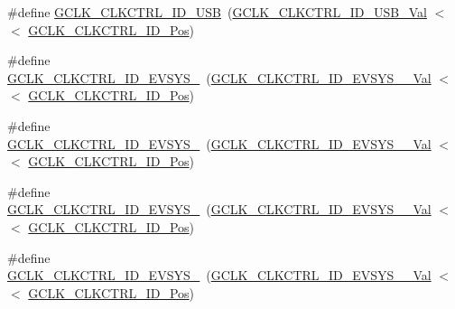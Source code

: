 \begin{DoxyCompactItemize}
\item 
\#define \mbox{\hyperlink{group___s_a_m_d21___g_c_l_k_ga8260e7bdb03e8421e8e8aeeafcc073f3}{G\+C\+L\+K\+\_\+\+C\+L\+K\+C\+T\+R\+L\+\_\+\+I\+D\+\_\+\+U\+SB}}~(\mbox{\hyperlink{group___s_a_m_d21___g_c_l_k_ga5bff2fb927a4b63837aec5ea464ba61b}{G\+C\+L\+K\+\_\+\+C\+L\+K\+C\+T\+R\+L\+\_\+\+I\+D\+\_\+\+U\+S\+B\+\_\+\+Val}}       $<$$<$ \mbox{\hyperlink{group___s_a_m_d21___g_c_l_k_ga882860b306b819b8bb342bebd55c23aa}{G\+C\+L\+K\+\_\+\+C\+L\+K\+C\+T\+R\+L\+\_\+\+I\+D\+\_\+\+Pos}})
\item 
\#define \mbox{\hyperlink{group___s_a_m_d21___g_c_l_k_ga3a091994ea0d246cac926f9387f5f60e}{G\+C\+L\+K\+\_\+\+C\+L\+K\+C\+T\+R\+L\+\_\+\+I\+D\+\_\+\+E\+V\+S\+Y\+S\+\_}}~(\mbox{\hyperlink{group___s_a_m_d21___g_c_l_k_ga24b8d07991d73b984d3ee5dbbfa43de1}{G\+C\+L\+K\+\_\+\+C\+L\+K\+C\+T\+R\+L\+\_\+\+I\+D\+\_\+\+E\+V\+S\+Y\+S\+\_\+\_\+\+Val}}   $<$$<$ \mbox{\hyperlink{group___s_a_m_d21___g_c_l_k_ga882860b306b819b8bb342bebd55c23aa}{G\+C\+L\+K\+\_\+\+C\+L\+K\+C\+T\+R\+L\+\_\+\+I\+D\+\_\+\+Pos}})
\item 
\#define \mbox{\hyperlink{group___s_a_m_d21___g_c_l_k_ga7b413cbf9a0a4a5261a629ff4b02eb1d}{G\+C\+L\+K\+\_\+\+C\+L\+K\+C\+T\+R\+L\+\_\+\+I\+D\+\_\+\+E\+V\+S\+Y\+S\+\_}}~(\mbox{\hyperlink{group___s_a_m_d21___g_c_l_k_ga33cf2ca39bd86e29c71d2d46e23419b5}{G\+C\+L\+K\+\_\+\+C\+L\+K\+C\+T\+R\+L\+\_\+\+I\+D\+\_\+\+E\+V\+S\+Y\+S\+\_\+\_\+\+Val}}   $<$$<$ \mbox{\hyperlink{group___s_a_m_d21___g_c_l_k_ga882860b306b819b8bb342bebd55c23aa}{G\+C\+L\+K\+\_\+\+C\+L\+K\+C\+T\+R\+L\+\_\+\+I\+D\+\_\+\+Pos}})
\item 
\#define \mbox{\hyperlink{group___s_a_m_d21___g_c_l_k_ga130e1eafd6a515744428291c962bb3c3}{G\+C\+L\+K\+\_\+\+C\+L\+K\+C\+T\+R\+L\+\_\+\+I\+D\+\_\+\+E\+V\+S\+Y\+S\+\_}}~(\mbox{\hyperlink{group___s_a_m_d21___g_c_l_k_ga2a41efb893147142a523da4ffd9b6e4e}{G\+C\+L\+K\+\_\+\+C\+L\+K\+C\+T\+R\+L\+\_\+\+I\+D\+\_\+\+E\+V\+S\+Y\+S\+\_\+\_\+\+Val}}   $<$$<$ \mbox{\hyperlink{group___s_a_m_d21___g_c_l_k_ga882860b306b819b8bb342bebd55c23aa}{G\+C\+L\+K\+\_\+\+C\+L\+K\+C\+T\+R\+L\+\_\+\+I\+D\+\_\+\+Pos}})
\item 
\#define \mbox{\hyperlink{group___s_a_m_d21___g_c_l_k_ga08ec8d0eddcfaeefdfb1cec9fac63fd8}{G\+C\+L\+K\+\_\+\+C\+L\+K\+C\+T\+R\+L\+\_\+\+I\+D\+\_\+\+E\+V\+S\+Y\+S\+\_}}~(\mbox{\hyperlink{group___s_a_m_d21___g_c_l_k_gaf3e4dae1c92305f72ab76d6574385b69}{G\+C\+L\+K\+\_\+\+C\+L\+K\+C\+T\+R\+L\+\_\+\+I\+D\+\_\+\+E\+V\+S\+Y\+S\+\_\+\_\+\+Val}}   $<$$<$ \mbox{\hyperlink{group___s_a_m_d21___g_c_l_k_ga882860b306b819b8bb342bebd55c23aa}{G\+C\+L\+K\+\_\+\+C\+L\+K\+C\+T\+R\+L\+\_\+\+I\+D\+\_\+\+Pos}})
$$
\end{DoxyCompactItemize}
